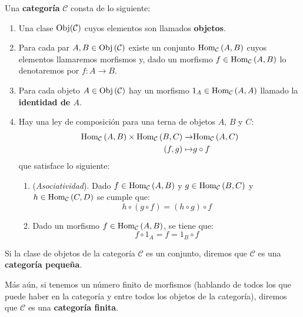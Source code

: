 \documentclass[12pt]{report}
\theoremstyle{largebreak}
\newcommand\cf[3]{\ensuremath{#1:#2\rightarrow#3}}
\newcommand{\Obj}[1]{\ensuremath{\textup{Obj}\left(#1\right)}}
\newcommand{\Hom}[3]{\ensuremath{\textup{Hom}_{#1}\left(#2,#3\right)}}
\begin{document}
    \begin{mydef}
        Una \textbf{categoría} $\mathcal{C}$ consta de lo siguiente:
        \begin{enumerate}
            \item Una clase $\textup{Obj}(\mathcal{C})$ cuyos elementos son llamados \textbf{objetos}.
            \item Para cada par $A,B\in\Obj{\mathcal{C}}$ existe un conjunto $\Hom{\mathcal{C}}{A}{B}$ cuyos elementos llamaremos morfismos y, dado un morfismo $f\in\Hom{\mathcal{C}}{A}{B}$ lo denotaremos por $\cf{f}{A}{B}$.
            \item Para cada objeto $A\in\Obj{\mathcal{C}}$ hay un morfismo $1_A\in\Hom{\mathcal{C}}{A}{A}$ llamado la \textbf{identidad de $A$}.
            \item Hay una ley de composición para una terna de objetos $A$, $B$ y $C$:
            \begin{equation*}
                \begin{split}
                    \Hom{\mathcal{C}}{A}{B}\times\Hom{\mathcal{C}}{B}{C}\rightarrow&\Hom{\mathcal{C}}{A}{C}\\
                    (f,g)\mapsto&g\circ f\\
                \end{split}
            \end{equation*}
            que satisface lo siguiente:
            \begin{enumerate}
                \item (\textit{Asociatividad}). Dado $f\in\Hom{\mathcal{C}}{A}{B}$ y $g\in\Hom{\mathcal{C}}{B}{C}$ y $h\in\Hom{\mathcal{C}}{C}{D}$ se cumple que:
                \begin{equation*}
                    h\circ (g\circ f)=(h\circ g)\circ f
                \end{equation*}
                \item Dado un morfismo $f\in\Hom{\mathcal{C}}{A}{B}$, se tiene que:
                \begin{equation*}
                    f\circ 1_A=f=1_B\circ f
                \end{equation*}
            \end{enumerate}
        \end{enumerate}
    \end{mydef}

    \begin{mydef}
        Si la clase de objetos de la categoría $\mathcal{C}$ es un conjunto, diremos que $\mathcal{C}$ es una \textbf{categoría pequeña}. 
        
        Más aún, si tenemos un número finito de morfismos (hablando de todos los que puede haber en la categoría y entre todos los objetos de la categoría), diremos que $\mathcal{C}$ es una \textbf{categoría finita}.
    \end{mydef}
\end{document}

